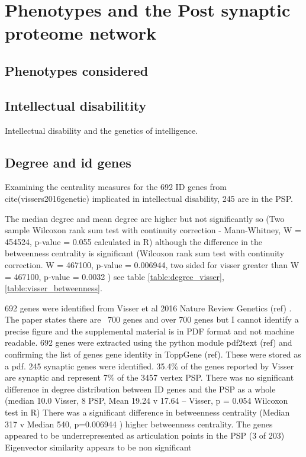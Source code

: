 \chapter{Phenotypes and the Post synaptic proteome network}
\section{Phenotypes considered}


\section{Intellectual disabilitity}
Intellectual disability and the genetics of intelligence. 
\section{Degree and id genes}
Examining the centrality measures for the 692 ID genes from cite(vissers2016genetic) implicated in intellectual disability,  245 are in the PSP.


 The median degree and mean degree are higher but not significantly so (Two sample Wilcoxon rank sum test with continuity correction - Mann-Whitney, W = 454524, p-value = 0.055 calculated in R) although the difference in the betweenness centrality is significant (Wilcoxon rank sum test with continuity correction. W = 467100, p-value = 0.006944, two sided for visser greater than W = 467100, p-value = 0.0032 ) see table \ref{table:degree_visser}, \ref{table:visser_betweenness}. 
 
692 genes were identified from Visser et al 2016 Nature Review Genetics (ref) . The paper states there are ~700 genes and over 700 genes but I cannot identify a precise figure and the supplemental material is in PDF format and not machine readable.
692 genes were extracted using the python module pdf2text (ref) and confirming the list of genes gene identity in ToppGene (ref). These were stored as a pdf.
245 synaptic genes were identified. 35.4\% of the genes reported by Visser are synaptic and represent 7\% of the 3457 vertex PSP.  
There was no significant difference in degree distribution between ID genes and the PSP as a whole 
(median 10.0 Visser, 8 PSP, Mean 19.24 v 17.64 – Visser, p = 0.054 Wilcoxon test in R)
There was a significant difference in betweenness centrality (Median 317 v Median 540, p=0.006944 ) higher betweenness centrality. The genes appeared to be underrepresented as articulation points in the PSP (3 of 203)
Eigenvector similarity appears to be non significant

